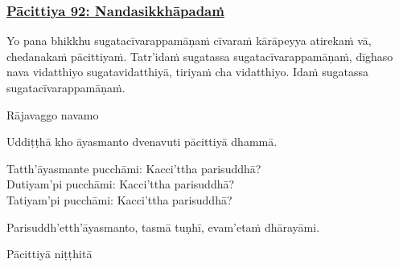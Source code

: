 \subsubsection*{\hyperref[exp92]{Pācittiya 92: Nandasikkhāpadaṁ}}
\label{pac92}
Yo pana bhikkhu sugatacīvarappamāṇaṁ cīvaraṁ kārāpeyya atirekaṁ vā, chedanakaṁ pācittiyaṁ. Tatr'idaṁ sugatassa sugatacīvarappamāṇaṁ, dīghaso nava vidatthiyo sugatavidatthiyā, tiriyaṁ cha vidatthiyo. Idaṁ sugatassa sugatacīvarappamāṇaṁ.

\begin{center}
  Rājavaggo navamo
\end{center}

\medskip

\begin{center}
Uddiṭṭhā kho āyasmanto dvenavuti pācittiyā dhammā.

\smallskip

Tatth'āyasmante pucchāmi: Kacci'ttha parisuddhā?\\
Dutiyam'pi pucchāmi: Kacci'ttha parisuddhā?\\
Tatiyam'pi pucchāmi: Kacci'ttha parisuddhā?

\smallskip

Parisuddh'etth'āyasmanto, tasmā tuṇhī, evam'etaṁ dhārayāmi.
\end{center}

\begin{outro}
  Pācittiyā niṭṭhitā
\end{outro}

\clearpage
